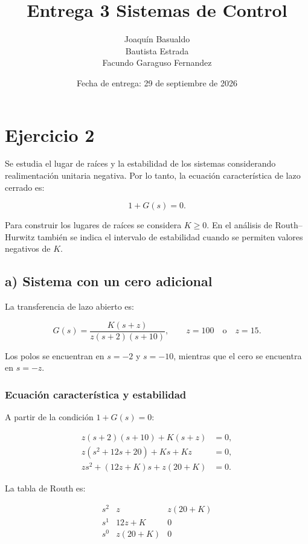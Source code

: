 \documentclass[12pt,a4paper]{article}
\title{Entrega 3 Sistemas de Control}
\author{
    Joaquín Basualdo\\
    Bautista Estrada\\
    Facundo Garaguso Fernandez
}
\date{Fecha de entrega: 29 de septiembre de 2026}
\begin{document}
\maketitle

\clearpage

\section*{Ejercicio 2}

Se estudia el lugar de raíces y la estabilidad de los sistemas
considerando realimentación unitaria negativa. Por lo tanto,
la ecuación característica de lazo cerrado es:

\[
1+G(s)=0.
\]

Para construir los lugares de raíces se considera $K\geq0$.
En el análisis de Routh--Hurwitz también se indica el intervalo
de estabilidad cuando se permiten valores negativos de $K$.



\subsection*{a) Sistema con un cero adicional}

La transferencia de lazo abierto es:

\[
G(s)
=
\frac{K(s+z)}
{z(s+2)(s+10)},
\qquad
z=100 \quad \text{o} \quad z=15.
\]

Los polos se encuentran en $s=-2$ y $s=-10$, mientras que
el cero se encuentra en $s=-z$.


\subsubsection*{Ecuación característica y estabilidad}

A partir de la condición $1+G(s)=0$:

\begin{align*}
z(s+2)(s+10)+K(s+z)&=0,\\
z(s^2+12s+20)+Ks+Kz&=0,\\
zs^2+(12z+K)s+z(20+K)&=0.
\end{align*}

La tabla de Routh es:

\[
\begin{array}{c|cc}
s^2 & z       & z(20+K)\\
s^1 & 12z+K   & 0\\
s^0 & z(20+K) & 0
\end{array}
\]
\end{document}
